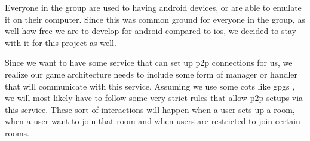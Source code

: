 Everyone in the group are used to having android devices, or are able to emulate it on their computer. Since this was common ground for everyone in the group, as well how free we are to develop for android compared to ios, we decided to stay with it for this project as well.


Since we want to have some service that can set up \gls{p2p} connections for us, we realize our game architecture needs to include some form of manager or handler that will communicate with this service. Assuming we use some \gls{cots} like \gls{gpgs} \citep{gpgs}, we will most likely have to follow some very strict rules that allow \gls{p2p} setups via this service. These sort of interactions will happen when a user sets up a room, when a user want to join that room and when users are restricted to join certain rooms.
